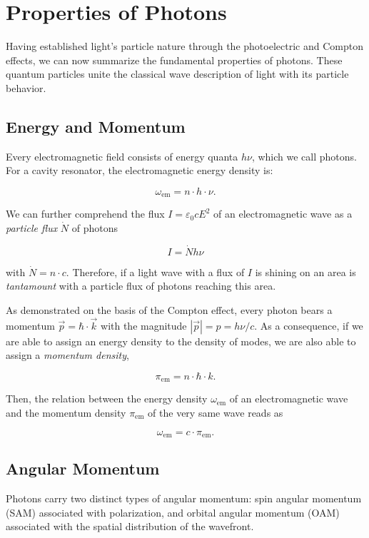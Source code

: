\documentclass[
  a4paper,
]{book}
\begin{document}
\section{Properties of Photons}\label{properties-of-photons}

Having established light's particle nature through the photoelectric and
Compton effects, we can now summarize the fundamental properties of
photons. These quantum particles unite the classical wave description of
light with its particle behavior.

\subsection{Energy and Momentum}\label{energy-and-momentum}

Every electromagnetic field consists of energy quanta \(h\nu\), which we
call photons. For a cavity resonator, the electromagnetic energy density
is:

\[
\omega_{\mathrm{em}} = n \cdot h \cdot \nu \mathrm{.}
\]

We can further comprehend the flux \(I = \varepsilon_0 c E^2\) of an
electromagnetic wave as a \emph{particle flux} \(\dot{N}\) of photons

\[
I = \dot{N} h \nu
\]

with \(\dot{N} = n \cdot c\). Therefore, if a light wave with a flux of
\(I\) is shining on an area is \emph{tantamount} with a particle flux of
photons reaching this area.

As demonstrated on the basis of the Compton effect, every photon bears a
momentum \(\vec{p} = \hbar \cdot \vec{k}\) with the magnitude
\(\left| \vec{p} \right| = p = h \nu / c\). As a consequence, if we are
able to assign an energy density to the density of modes, we are also
able to assign a \emph{momentum density},

\[
\pi_{\mathrm{em}} = n \cdot \hbar \cdot k \mathrm{.}
\]

Then, the relation between the energy density \(\omega_{\mathrm{em}}\)
of an electromagnetic wave and the momentum density
\(\pi_{\mathrm{em}}\) of the very same wave reads as

\[
\omega_{\mathrm{em}} = c \cdot \pi_{\mathrm{em}} {.}
\]

\subsection{Angular Momentum}\label{angular-momentum}

Photons carry two distinct types of angular momentum: spin angular
momentum (SAM) associated with polarization, and orbital angular
momentum (OAM) associated with the spatial distribution of the
wavefront.
\end{document}
